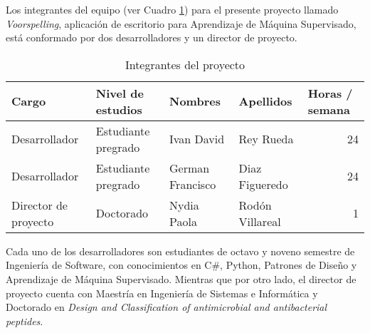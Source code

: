 Los integrantes del equipo (ver Cuadro \ref{tab:integrantes}) para el presente proyecto llamado \textit{Voorspelling}, aplicación de escritorio para Aprendizaje de Máquina Supervisado, está conformado por dos desarrolladores y un director de proyecto.

\begin{table}[H]
    \centering
    \caption{Integrantes del proyecto}
    \footnotesize
    \begin{tabular}{llllr}
        \hline
        Cargo & Nivel de estudios & Nombres & Apellidos & \multicolumn{1}{l}{Horas / semana} \bigstrut\\
        \hline
        Desarrollador & Estudiante pregrado & Ivan David & Rey Rueda & 24 \bigstrut[t]\\
        Desarrollador & Estudiante pregrado & German Francisco & Diaz Figueredo & 24 \\
        Director de proyecto & Doctorado & Nydia Paola & Rodón Villareal & 1 \bigstrut[b]\\
        \hline
    \end{tabular}%
  \label{tab:integrantes}%
\end{table}%

Cada uno de los desarrolladores son estudiantes de octavo y noveno semestre de Ingeniería de Software, con conocimientos en C\#, Python, Patrones de Diseño y Aprendizaje de Máquina Supervisado. Mientras que por otro lado, el director de proyecto cuenta con Maestría en Ingeniería de Sistemas e Informática y Doctorado en \textit{Design and Classification of antimicrobial and antibacterial peptides}.